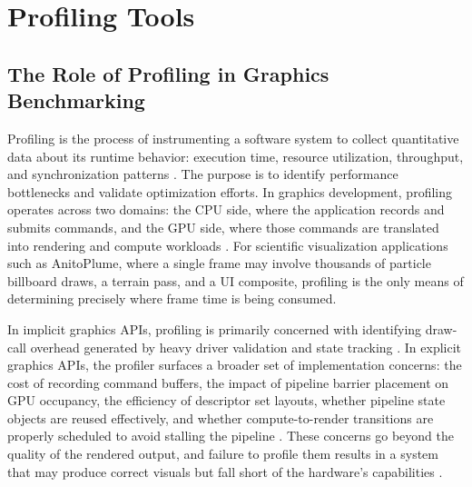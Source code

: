 



\section{Profiling Tools}
\label{sec:profiling_tools}

\subsection{The Role of Profiling in Graphics Benchmarking}
\label{sec:profiling_importance}

Profiling is the process of instrumenting a software system to collect quantitative data about its runtime behavior: execution time, resource utilization, throughput, and synchronization patterns \cite{cheung2024applications}. The purpose is to identify performance bottlenecks and validate optimization efforts.
In graphics development, profiling operates across two domains: the CPU side, where the application records and submits commands, and the GPU side, where those commands are translated into rendering and compute workloads \cite{ping2026modern}.
For scientific visualization applications such as AnitoPlume, where a single frame may involve thousands of particle billboard draws, a terrain pass, and a UI composite, profiling is the only means of determining precisely where frame time is being consumed.

In implicit graphics APIs, profiling is primarily concerned with identifying draw-call overhead generated by heavy driver validation and state tracking \cite{shiraef2016exploratory}.
In explicit graphics APIs, the profiler surfaces a broader set of implementation concerns: the cost of recording command buffers, the impact of pipeline barrier placement on GPU occupancy, the efficiency of descriptor set layouts, whether pipeline state objects are reused effectively, and whether compute-to-render transitions are properly scheduled to avoid stalling the pipeline \cite{ping2026modern,vulkan14spec2024}.
These concerns go beyond the quality of the rendered output, and failure to profile them results in a system that may produce correct visuals but fall short of the hardware's capabilities \cite{IoannidisC.2020MRFC}.

